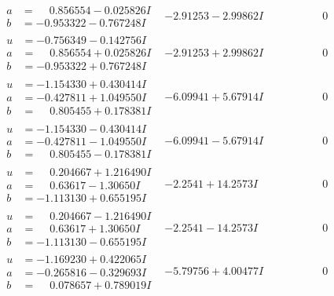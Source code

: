 \documentclass[1p]{elsarticle_modified}
\theoremstyle{definition}
\begin{document}
$$\begin{array}{c|c|c}
\begin{aligned}
a &= \phantom{-}0.856554 - 0.025826 I \\
b &= -0.953322 - 0.767248 I\end{aligned}
 & -2.91253 - 2.99862 I & \phantom{-0.000000 } 0 \\ \hline\begin{aligned}
u &= -0.756349 - 0.142756 I \\
a &= \phantom{-}0.856554 + 0.025826 I \\
b &= -0.953322 + 0.767248 I\end{aligned}
 & -2.91253 + 2.99862 I & \phantom{-0.000000 } 0 \\ \hline\begin{aligned}
u &= -1.154330 + 0.430414 I \\
a &= -0.427811 + 1.049550 I \\
b &= \phantom{-}0.805455 + 0.178381 I\end{aligned}
 & -6.09941 + 5.67914 I & \phantom{-0.000000 } 0 \\ \hline\begin{aligned}
u &= -1.154330 - 0.430414 I \\
a &= -0.427811 - 1.049550 I \\
b &= \phantom{-}0.805455 - 0.178381 I\end{aligned}
 & -6.09941 - 5.67914 I & \phantom{-0.000000 } 0 \\ \hline\begin{aligned}
u &= \phantom{-}0.204667 + 1.216490 I \\
a &= \phantom{-}0.63617 - 1.30650 I \\
b &= -1.113130 + 0.655195 I\end{aligned}
 & -2.2541 + 14.2573 I & \phantom{-0.000000 } 0 \\ \hline\begin{aligned}
u &= \phantom{-}0.204667 - 1.216490 I \\
a &= \phantom{-}0.63617 + 1.30650 I \\
b &= -1.113130 - 0.655195 I\end{aligned}
 & -2.2541 - 14.2573 I & \phantom{-0.000000 } 0 \\ \hline\begin{aligned}
u &= -1.169230 + 0.422065 I \\
a &= -0.265816 - 0.329693 I \\
b &= \phantom{-}0.078657 + 0.789019 I\end{aligned}
 & -5.79756 + 4.00477 I & \phantom{-0.000000 } 0 \\ \hline\begin{aligned}

\end{aligned}
\end{array}$$
\end{document}
